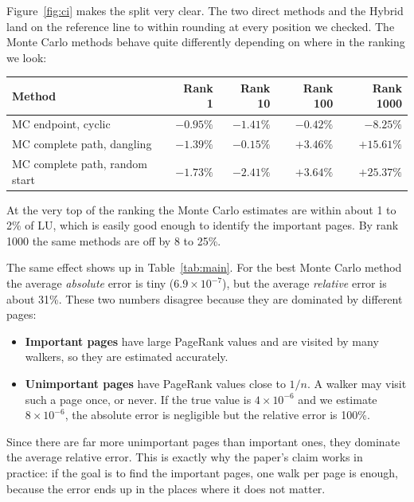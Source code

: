 \documentclass[11pt,a4paper]{article}
\begin{document}
Figure~\ref{fig:ci} makes the split very clear. The two direct methods and the
Hybrid land on the reference line to within rounding at every position we checked. The
Monte Carlo methods behave quite differently depending on where in the ranking we
look:

\begin{center}
\begin{tabular}{lrrrr}
\toprule
\textbf{Method} & \textbf{Rank 1} & \textbf{Rank 10} & \textbf{Rank 100} & \textbf{Rank 1000} \\
\midrule
MC endpoint, cyclic            & $-0.95\%$ & $-1.41\%$ & $-0.42\%$ & $-8.25\%$ \\
MC complete path, dangling     & $-1.39\%$ & $-0.15\%$ & $+3.46\%$ & $+15.61\%$ \\
MC complete path, random start & $-1.73\%$ & $-2.41\%$ & $+3.64\%$ & $+25.37\%$ \\
\bottomrule
\end{tabular}
\end{center}

\noindent
At the very top of the ranking the Monte Carlo estimates are within about 1 to 2\% of
LU, which is easily good enough to identify the important pages. By rank 1000 the same
methods are off by 8 to 25\%.

The same effect shows up in Table~\ref{tab:main}. For the best Monte Carlo method the
average \emph{absolute} error is tiny ($6.9\times10^{-7}$), but the average
\emph{relative} error is about 31\%. These two numbers disagree because they are
dominated by different pages:

\begin{itemize}
  \item \textbf{Important pages} have large PageRank values and are visited by many
        walkers, so they are estimated accurately.
  \item \textbf{Unimportant pages} have PageRank values close to $1/n$. A walker may
        visit such a page once, or never. If the true value is $4\times10^{-6}$ and we
        estimate $8\times10^{-6}$, the absolute error is negligible but the relative
        error is 100\%.
\end{itemize}

Since there are far more unimportant pages than important ones, they dominate the
average relative error. This is exactly why the paper's claim works in practice: if
the goal is to find the important pages, one walk per page is enough, because the
error ends up in the places where it does not matter.
\end{document}
